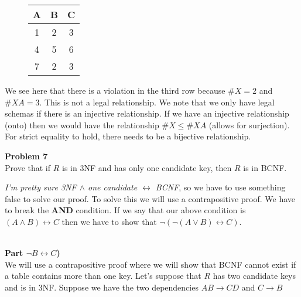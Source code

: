 \documentclass[12pt,letter]{article}
\newcommand{\problem}[1]{\vspace{3mm}\Large\textbf{{Problem
{#1}\vspace{3mm}}}\normalsize\\}
\newcommand{\ppart}[1]{\vspace{2mm}\large\textbf{\\Part
{#1})\vspace{2mm}}\normalsize\\}
\begin{document}
\FloatBarrier
\begin{figure}[ht]
    \center
\begin{tabular}{|c|c|c|}
    \hline
    A & B & C \\
    \hline
    1 & 2 & 3 \\
    \hline
    4 & 5 & 6 \\
    \hline
    7 & 2 & 3 \\
    \hline
\end{tabular}
\end{figure}
\FloatBarrier

We see here that there is a violation in the third row because $\#X = 2$ and
$\#XA = 3$. This is not a legal relationship.  We note that we only have legal
schemas if there is an injective relationship. If we have an injective
relationship (onto) then we would have the relationship $\#X \leq \#XA$ (allows
for surjection). For strict equality to hold, there needs to be a bijective
relationship.


\problem{7}
Prove that if $R$ is in 3NF and has only one candidate key, then $R$ is in BCNF.

\textit{I'm pretty sure 3NF $\wedge$ one candidate $\leftrightarrow$ BCNF}, so we
have to use something false to solve our proof. To solve this we will use a
contrapositive proof. We have to break the \textbf{AND} condition. If we say
that our above condition is $(A\wedge B) \leftrightarrow C$ then we have to show
that $\neg(\neg (A \vee B) \leftrightarrow C)$.

\ppart{$\neg B \leftrightarrow C$}
We will use a contrapositive proof where we will show that BCNF cannot exist if
a table contains more than one key.
Let's suppose that $R$ has two candidate keys and is in 3NF. Suppose we have the
two dependencies $AB \rightarrow CD$ and $C\rightarrow B$

\begin{figure}[ht]
    \center
\end{figure}
\end{document}
